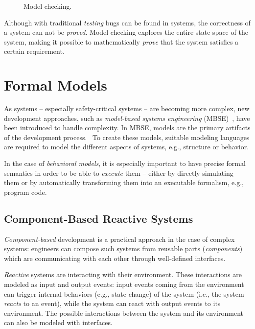 \begin{figure}[htbp]
\centering

\caption{Model checking.}
\label{fig:mc}
\end{figure}

Although with traditional \textit{testing} bugs can be found in systems, the correctness of a system can not be \textit{proved}. Model checking explores the entire state space of the system, making it possible to mathematically \textit{prove} that the system satisfies a certain requirement.

\section{Formal Models}\label{sec:form-models}

As systems -- especially safety-critical systems -- are becoming more complex, new development approaches, such as \textit{model-based systems engineering} (MBSE)~\cite{mbse}, have been introduced to handle complexity. In MBSE, models are the primary artifacts of the development process.~\cite{Seidewitz2003} To create these models, suitable modeling languages are required to model the different aspects of systems, e.g., structure or behavior.

In the case of \textit{behavioral models}, it is especially important to have precise formal semantics in order to be able to \textit{execute} them -- either by directly simulating them or by automatically transforming them into an executable formalism, e.g., program code.

\subsection{Component-Based Reactive Systems}

\textit{Component-based} development is a practical approach in the case of complex systems: engineers can compose such systems from reusable parts (\textit{components}) which are communicating with each other through well-defined interfaces.

\textit{Reactive} systems are interacting with their environment. These interactions are modeled as input and output events: input events coming from the environment can trigger internal behaviors (e.g., state change) of the system (i.e., the system \textit{reacts} to an event), while the system can react with output events to its environment. The possible interactions between the system and its environment can also be modeled with interfaces.

